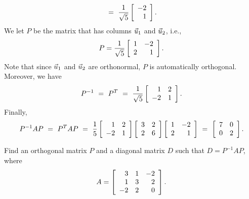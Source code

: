 \documentclass{ximera}
\begin{document}
\begin{solution}
\begin{equation*}
    ~=~ \frac{1}{\sqrt{5}} \startmat{r} -2 \\ 1 \stopmat.
  \end{equation*}
  We let $P$ be the matrix that has columns $\vect{u}_1$ and
  $\vect{u}_2$, i.e.,
  \begin{equation*}
    P = \frac{1}{\sqrt{5}} \startmat{rr} 1 & -2 \\ 2 & 1 \stopmat.
  \end{equation*}
  Note that since $\vect{u}_1$ and $\vect{u}_2$ are orthonormal, $P$
  is automatically orthogonal. Moreover, we
  have
  \begin{equation*}
    P^{-1}
    ~=~ P^T
    ~=~ \frac{1}{\sqrt{5}} \startmat{rr} 1 & 2 \\ -2 & 1 \stopmat.
  \end{equation*}
  Finally,
  \begin{equation*}
    P^{-1}AP
    ~=~ P^TAP
    ~=~ \frac{1}{5}
    \startmat{rr} 1 & 2 \\ -2 & 1 \stopmat
    \startmat{rr} 3 & 2 \\ 2 & 6 \stopmat
    \startmat{rr} 1 & -2 \\ 2 & 1 \stopmat
    ~=~ \startmat{rr} 7 & 0 \\ 0 & 2 \stopmat.
  \end{equation*}
\end{solution}

\begin{example}\label{ex:diagonalization-symmetric2}
  Find an orthogonal matrix $P$ and a diagonal matrix $D$ such that $D =
  P^{-1}AP$, where
  \begin{equation*}
    A = \startmat{rrr}
      3  & 1 & -2 \\
      1  & 3 &  2 \\
      -2 & 2 &  0 \\
    \stopmat.
  \end{equation*}
\end{example}
\end{document}
